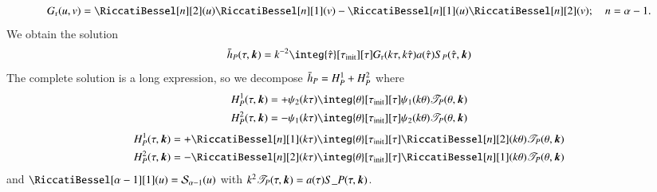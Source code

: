     \begin{equation}
        G\ped{r}(u, v)  =\RiccatiBessel[n][2](u) \RiccatiBessel[n][1](v)- \RiccatiBessel[n][1](u) \RiccatiBessel[n][2](v) ; \quad n= \alpha-1.
    \end{equation}
    \citep{kawasakiStudyGravitationalRadiation2011} %
    We obtain the solution
    \begin{equation}
        \ah_P(\tau, \vec{k}) = k^{-2} \integ{\hat{\tau}}[\tau\ped{init}][\tau] G\ped{r}(k\tau, k\hat{\tau}) a (\hat{\tau}) S_P(\hat{\tau}, \vec{k})
    \end{equation}
    The complete solution is a long expression, so we decompose $\bar{h}_P = H^1_P + H^2_P$ where
    \begin{align}
        H_P^1(\tau, \vec{k}) &= +\psi_2(k\tau) \integ{\theta}[\tau\ped{init}][\tau]  \psi_1(k\theta) \Src_P(\theta, \vec{k}) \\
        H_P^2(\tau, \vec{k}) &= -\psi_1(k\tau) \integ{\theta}[\tau\ped{init}][\tau]  \psi_2(k\theta) \Src_P(\theta, \vec{k})
    \end{align}
    \begin{align}
        H_P^1(\tau, \vec{k}) &= +\RiccatiBessel[n][1](k\tau) \integ{\theta}[\tau\ped{init}][\tau]  \RiccatiBessel[n][2](k\theta)  \Src_P(\theta, \vec{k}) \\
        H_P^2(\tau, \vec{k}) &= -\RiccatiBessel[n][2](k\tau) \integ{\theta}[\tau\ped{init}][\tau]  \RiccatiBessel[n][1](k\theta) \Src_P(\theta, \vec{k})
    \end{align}
    and $\RiccatiBessel[\alpha-1][1](u) = \mathcal{S}_{\alpha-1}(u) $
    with $k^2\mathscr{T}_P(\tau, \boldsymbol{k}) = a(\tau) S\_P(\tau, \boldsymbol{k})$.
    

